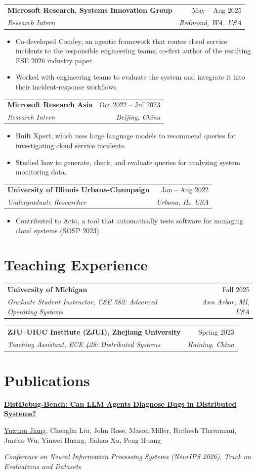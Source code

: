 \documentclass[11pt,letterpaper]{article}
\makeatletter
\newcommand{\entry}[4]{\Needspace{4\baselineskip}%
  \begin{tabularx}{\textwidth}{@{}Xr@{}}\textbf{#1} & #2\\
  \textit{#3} & \textit{#4}\end{tabularx}\par}
\newcommand{\pubentry}[3]{\Needspace{5\baselineskip}%
  \textbf{#1}\par #2\par\textit{#3}\par\vspace{0.35em}}
\makeatother
\begin{document}
\entry{Microsoft Research, Systems Innovation Group}{May -- Aug 2025}
{Research Intern}{Redmond, WA, USA}
\begin{itemize}
\item Co-developed Comfey, an agentic framework that routes cloud service incidents to the responsible engineering teams; co-first author of the resulting FSE 2026 industry paper.
\item Worked with engineering teams to evaluate the system and integrate it into their incident-response workflows.
\end{itemize}
\vspace{0.2em}

\entry{Microsoft Research Asia}{Oct 2022 -- Jul 2023}
{Research Intern}{Beijing, China}
\begin{itemize}
\item Built Xpert, which uses large language models to recommend queries for investigating cloud service incidents.
\item Studied how to generate, check, and evaluate queries for analyzing system monitoring data.
\end{itemize}
\vspace{0.2em}

\entry{University of Illinois Urbana-Champaign}{Jan -- Aug 2022}
{Undergraduate Researcher}{Urbana, IL, USA}
\begin{itemize}
\item Contributed to Acto, a tool that automatically tests software for managing cloud systems (SOSP 2023).
\end{itemize}

\section*{Teaching Experience}

\entry{University of Michigan}{Fall 2025}
{Graduate Student Instructor, CSE 582: Advanced Operating Systems}{Ann Arbor, MI, USA}
\vspace{0.25em}
\entry{ZJU--UIUC Institute (ZJUI), Zhejiang University}{Spring 2023}
{Teaching Assistant, ECE 428: Distributed Systems}{Haining, China}

\newpage
\section*{Publications}

\pubentry{\href{https://arxiv.org/abs/2611.03523}{DistDebug-Bench: Can LLM Agents Diagnose Bugs in Distributed Systems?}}{\underline{Yuxuan Jiang}, Chenglin Liu, John Rose, Mason Miller, Ruthesh Thavamani, Juntao Wu, Yinwei Huang, Jiahao Xu, Peng Huang}{Conference on Neural Information Processing Systems (NeurIPS 2026), Track on Evaluations and Datasets}
\end{document}
